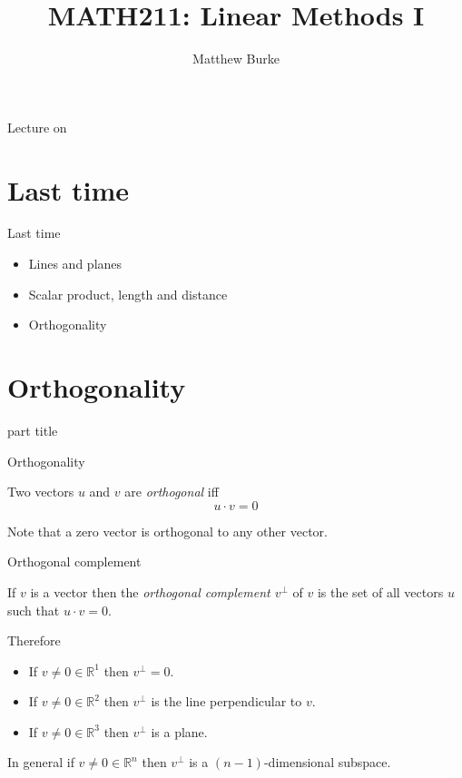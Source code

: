 \documentclass{beamer}
\title{MATH211: Linear Methods I}
\author{Matthew Burke}
\date{\lectureDate}
\newcommand{\lectureDate}{\formatdate{16}{10}{2018}}
\begin{document}
\frame{\titlepage}

\begin{frame}{Lecture on \lectureDate}
  \tableofcontents
\end{frame}

\section*{Last time}
\label{sec:Last-time}

\begin{frame}{Last time}
  \begin{itemize}
  \item Lines and planes\vfill
  \item Scalar product, length and distance\vfill
  \item Orthogonality
  \end{itemize}
\end{frame}

\section{Orthogonality}

\begin{frame}
  \begin{beamercolorbox}[sep=12pt,center]{part title}
    \insertsection\par
  \end{beamercolorbox}
\end{frame}

\begin{frame}{Orthogonality}
  \begin{definition}
    Two vectors $u$ and $v$ are \emph{orthogonal} iff
    \begin{equation*}
      u\cdot v = 0
    \end{equation*}
  \end{definition}\vfill
  Note that a zero vector is orthogonal to any other vector.
\end{frame}

\begin{frame}{Orthogonal complement}
  \begin{definition}
    If $v$ is a vector then the \emph{orthogonal complement $v^{\perp}$} of $v$ is the set of all vectors $u$ such that $u\cdot v = 0$.
  \end{definition}\vfill
  Therefore
  \begin{itemize}
  \item If $v\neq 0\in \mathbb R^1$ then $v^{\perp} = 0$.
  \item If $v\neq 0\in \mathbb R^2$ then $v^{\perp}$ is the line perpendicular to $v$.
  \item If $v\neq 0\in \mathbb R^3$ then $v^{\perp}$ is a plane.
  \end{itemize}\vfill
  In general if $v\neq 0 \in \mathbb R^n$ then $v^{\perp}$ is a $(n-1)$-dimensional subspace.
\end{frame}
\end{document}
